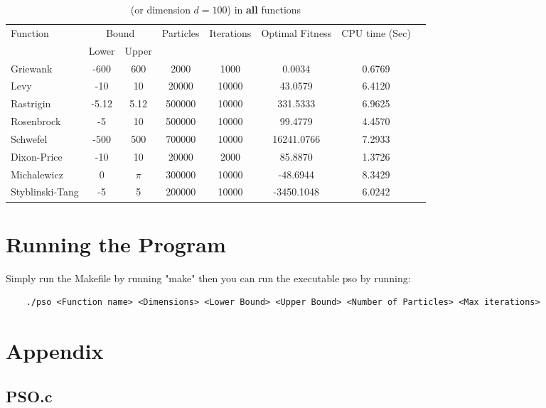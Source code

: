 \documentclass[12pt]{article}
\begin{document}
	\begin{table}[H]
		\caption{ (or dimension $d=100$) in \textbf{all} functions}
		\label{table:3}
		\centering
		\begin{tabular}{l c c c c c c c}
			\hline
			Function &  \multicolumn{2}{c}{Bound} & Particles & Iterations &  Optimal Fitness & CPU time (Sec) \\
			& Lower& Upper&&&\\
			\hline
			Griewank  & -600 & 600 & 2000 & 1000 & 0.0034 & 0.6769 \\
			Levy      & -10  & 10  & 20000 & 10000 & 43.0579 & 6.4120 \\
			Rastrigin & -5.12 & 5.12 & 500000 & 10000 & 331.5333 & 6.9625 \\    
			Rosenbrock& -5   & 10  & 500000 & 10000 & 99.4779 & 4.4570 \\
			Schwefel  & -500 & 500 & 700000 & 10000 & 16241.0766 & 7.2933 \\
			Dixon-Price & -10 & 10  & 20000 & 2000 & 85.8870 & 1.3726 \\
			Michalewicz & 0  & $\pi$ & 300000 & 10000 & -48.6944 & 8.3429 \\
			Styblinski-Tang & -5 & 5 & 200000 & 10000 & -3450.1048 & 6.0242 \\
			\hline
		\end{tabular}
	\end{table}
	 
	\newpage
    \section{Running the Program}
    Simply run the Makefile by running "make" then you can run the executable pso by running: 
    \begin{lstlisting}
    ./pso <Function name> <Dimensions> <Lower Bound> <Upper Bound> <Number of Particles> <Max iterations> 
    \end{lstlisting}
	\section{Appendix}
    \subsection{PSO.c}
	
\end{document}
